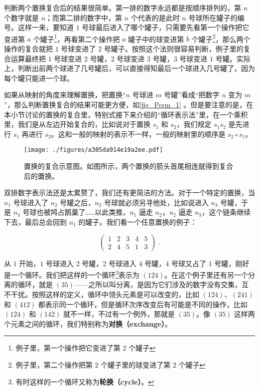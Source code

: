 判断两个置换复合后的结果很简单。第一排的数字永远都是按顺序排列的，第 $n$ 个数字就是 $n$；而第二排的数字中，第 $n$ 个代表的是此时 $n$ 号球所在罐子的编号。这样一来，要知道 $1$ 号球最后进入了哪个罐子，只需要先看第一个操作把它变进第 $a$ 个罐子\footnote{例子里，第一个操作把它变进了第 $2$ 个罐子}，再看第二个操作把 $a$ 罐子中的球变进第 $b$ 个罐子\footnote{例子里，第二个操作把第 $2$ 个罐子里的球变进了第 $2$ 个罐子}，那么两个操作的复合就把 $1$ 号球变进了 $2$ 号罐子。按照这个法则很容易判断，例子里的复合运算最终把 $1$ 号球变进 $2$ 号罐，$2$ 号球变进 $3$ 号罐，$3$ 号球变进 $1$ 号罐。实际上，判断出前两个球进了几号罐后，可以直接得知最后一个球进入几号罐了，因为每个罐只能进一个球。

如果从映射的角度来理解置换，把置换“$n$ 号球进 $m$ 号罐”看成“把数字 $n$ 变为 $m$”，那么判断置换复合的结果可能更方便，如\autoref{fig_Perm_1} 。但是要注意的是，在本小节讨论的置换的复合里，特别式接下来介绍的“循环表示法”里，在一个乘积里，我们是从左边开始复合的，比如说对于置换 $s_1$ 和 $s_2$，我们规定 $s_1s_2$ 是先进行 $s_1$ 再进行 $s_2$。这和一般的映射的表示不一样，一般的映射里的顺序是 $s_2\circ s_1$。






\begin{figure}[ht]
\centering
\texttt{[image: ./figures/a305da914e19a2ee.pdf]}
\caption{置换的复合示意图。如图所示，两个置换的箭头首尾相连就得到复合后的置换。} \label{fig_Perm_1}
\end{figure}


双排数字表示法还是太累赘了，我们还有更简洁的方法。对于一个特定的置换，当 $n_1$ 号球进入了 $n_2$ 号罐之后，$n_2$ 号球就必须另寻他处，比如说进入 $n_3$ 号罐，于是 $n_3$ 号球也被鸠占鹊巢了……以此类推，$n_1$ 逼走 $n_2$，$n_2$ 逼走 $n_3$，这个链条继续下去，最后总会回到 $n_1$ 的罐子。我们看一个任意置换的例子：

\begin{equation}\label{eq_Perm_1}\begin{pmatrix}
1&2&3&4&5\\2&4&5&1&3
\end{pmatrix}~.\end{equation}

从 $1$ 开始，$1$ 号球进入 $2$ 号罐，$2$ 号球进入 $4$ 号罐，$4$ 号球又占了 $1$ 号罐，刚好是一个循环。我们把这样的一个循环\footnote{有时这样的一个循环又称为\textbf{轮换（cycle）}。}表示为 $(1 2 4)$。在这个例子里还有另一个分离的循环，就是 $(3 5)$——之所以叫分离，是因为它们涉及的数字没有交集，互不干扰。按照这样的定义，循环中领头元素是可以改变的，比如 $(1 2 4)$、$(2 4 1)$ 和 $(4 1 2)$ 都表示同一个循环，但是循环次序改变后有可能是不同的操作，比如 $(1 2 4)$ 和 $(1 4 2)$ 就不一样，不过有一个例外，那就是 $(3 5)$。像 $(3 5)$ 这样两个元素之间的循环，我们特别称为\textbf{对换（exchange）}。

